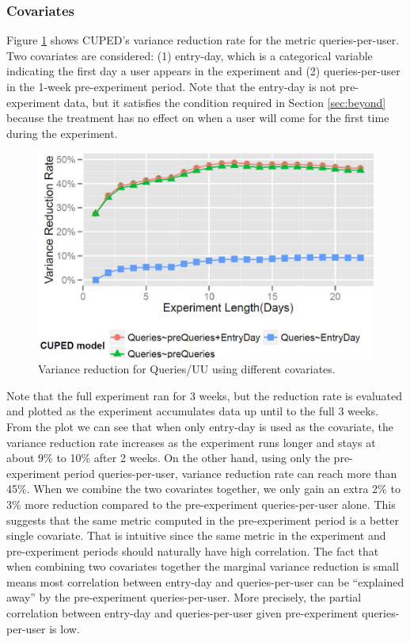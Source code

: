 \documentclass{sig-alternate}
\begin{document}
\subsubsection{Covariates}
Figure \ref{fig:QueriesPerUU} shows CUPED's variance reduction rate for the metric queries-per-user. Two covariates are considered: (1) entry-day, which is a categorical variable indicating the first day a user appears in the experiment and (2) queries-per-user in the 1-week pre-experiment period. Note that the entry-day is not pre-experiment data, but it satisfies the condition required in Section \ref{sec:beyond} because the treatment has no effect on when a user will come for the first time during the experiment. 
\begin{figure}[!hbtp]
  \centering
  \includegraphics[width=.5\textwidth]{queriesPerUUVarRed.eps}
  \caption{Variance reduction for Queries/UU using different covariates.}
  \label{fig:QueriesPerUU}
\end{figure}

Note that the full experiment ran for 3 weeks, but the reduction rate is evaluated and plotted as the experiment accumulates data up until to the full 3 weeks. From the plot we can see that when only entry-day is used as the covariate, the variance reduction rate increases as the experiment runs longer and stays at about 9\% to 10\% after 2 weeks. On the other hand, using only the pre-experiment period queries-per-user, variance reduction rate can reach more than 45\%.  When we combine the two covariates together, we only gain an extra 2\% to 3\% more reduction compared to the pre-experiment queries-per-user alone. This suggests that the same metric computed in the pre-experiment period is a better single covariate. That is intuitive since the same metric in the experiment and pre-experiment periods should naturally have high correlation. The fact that when combining two covariates together the marginal variance reduction is small means most correlation between entry-day and queries-per-user can be ``explained away'' by the pre-experiment queries-per-user. More precisely, the partial correlation between entry-day and queries-per-user given pre-experiment queries-per-user is low.
\end{document}
